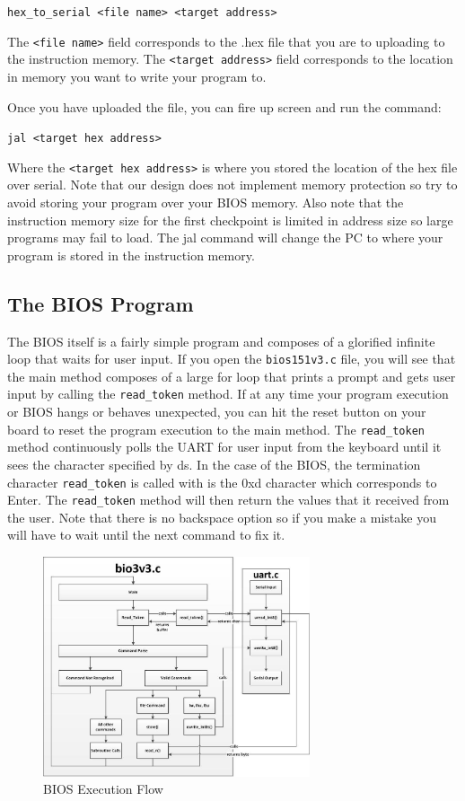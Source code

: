 \documentclass[11pt]{article}
\begin{document}
\verb|hex_to_serial <file name> <target address>|

The \verb|<file name>| field corresponds to the .hex file that you are to uploading to the instruction
memory. The \verb|<target address>| field corresponds to the location in memory you want to write
your program to.

Once you have uploaded the file, you can fire up screen and run the command:

\verb|jal <target hex address>|

Where the \verb|<target hex address>| is where you stored the location of the hex file over
serial. Note that our design does not implement memory protection so try to avoid storing your
program over your BIOS memory. Also note that the instruction memory size for the first
checkpoint is limited in address size so large programs may fail to load.
The jal command will change the PC to where your program is stored in the instruction
memory.

\subsection{The BIOS Program}
The BIOS itself is a fairly simple program and composes of a glorified infinite loop that waits for
user input. If you open the \verb|bios151v3.c| file, you will see that the main method composes of a
large for loop that prints a prompt and gets user input by calling the \verb|read_token| method.
If at any time your program execution or BIOS hangs or behaves unexpected, you can hit the
reset button on your board to reset the program execution to the main method.
The \verb|read_token| method continuously polls the UART for user input from the keyboard until it
sees the character specified by ds. In the case of the BIOS, the termination character
\verb|read_token| is called with is the 0xd character which corresponds to Enter.
The \verb|read_token| method will then return the values that it received from the user. Note that
there is no backspace option so if you make a mistake you will have to wait until the next
command to fix it.

\begin{figure}[H]
  \centering
  \includegraphics[width=0.7\textwidth]{bios_flow.png}
  \caption{BIOS Execution Flow}
\end{figure}
\end{document}
